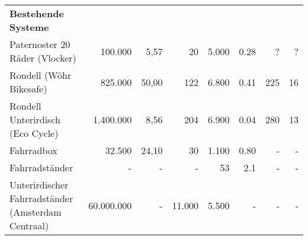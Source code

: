 \begin{landscape}
\begin{longtable}{p{}rrrrrrr}
    \textbf{Bestehende Systeme}                                                                                                                                                                                                                                                                                                    \\
    Paternoster 20 Räder (Vlocker)                     & 100.000                                    & \cite{vlocker_fläche,parkplatz_größe} 5,57 & \cite{vlocker_kapazität} 20          & \cite{vlocker_preis} 5.000 & 0.28                            & ?                                     & ?                                 \\
    Rondell (Wöhr Bikesafe)                            & \cite{richtpreisangebot} 825.000           & \cite{wöhr_fläche} 50,00                   & \cite{richtpreisangebot} 122         & 6.800                      & 0.41                            & 225                                   & \cite{wöhr_time} 16               \\
    Rondell Unterirdisch (Eco Cycle)                   & \cite{ecocycle_cost} 1.400.000             & \cite{ecocycle_giken} 8,56                 & \cite{ecocycle_giken} 204            & 6.900                      & 0.04                            & 280                                   & \cite{ecocycle_specifications} 13 \\
    Fahrradbox                                         & \cite{box_angebot_orion} 32.500            & \cite{box_angebot_orion} 24,10             & \cite{box_angebot_orion} 30          & 1.100                      & 0.80                            & -                                     & -                                 \\
    Fahrradständer                                     & -                                          & -                                          & -                                    & \cite{ständer_preis} 53    & \cite{leitfaden_vorarlberg} 2.1 & -                                     & -                                 \\
    Unterirdischer Fahrradständer (Amsterdam Centraal) & \cite{ständer_unter} 60.000.000            & -                                          & \cite{ständer_unter} 11.000          & 5.500                      & -                               & -                                     & -                                 \\


\end{longtable}
\end{landscape}
